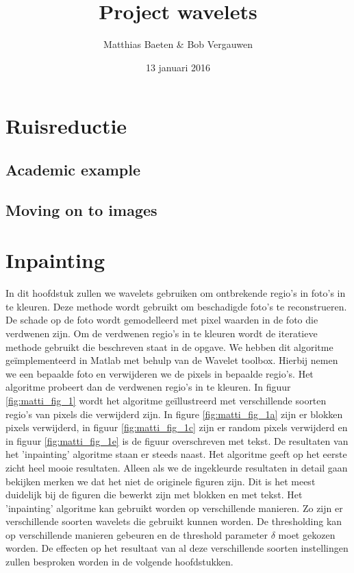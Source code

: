 

\title{Project wavelets}
\author{Matthias Baeten \& Bob Vergauwen}
\date{ 13 januari 2016}



\maketitle

\section{Ruisreductie}

\subsection{Academic example}

\subsection{Moving on to images}



\section{Inpainting}

In dit hoofdstuk zullen we wavelets gebruiken om ontbrekende regio's in foto's in te kleuren. Deze methode wordt gebruikt om beschadigde foto's te reconstrueren. De schade op de foto wordt gemodelleerd met pixel waarden in de foto die verdwenen zijn. Om de verdwenen regio's in te kleuren wordt de iteratieve methode gebruikt die beschreven staat in de opgave. We hebben dit algoritme ge\"{i}mplementeerd in Matlab met behulp van de Wavelet toolbox. Hierbij nemen we een bepaalde foto en verwijderen we de pixels in bepaalde regio's. Het algoritme probeert dan de verdwenen regio's in te kleuren. 
\newline
\newline
In figuur \ref{fig:matti_fig_1} wordt het algoritme ge\"{i}llustreerd met verschillende soorten regio's van pixels die verwijderd zijn. In figure \ref{fig:matti_fig_1a} zijn er blokken pixels verwijderd, in figuur \ref{fig:matti_fig_1c} zijn er random pixels verwijderd en in figuur \ref{fig:matti_fig_1e} is de figuur overschreven met tekst. De resultaten van het 'inpainting' algoritme staan er steeds naast. Het algoritme geeft op het eerste zicht heel mooie resultaten. Alleen als we de ingekleurde resultaten in detail gaan bekijken merken we dat het niet de originele figuren zijn. Dit is het meest duidelijk bij de figuren die bewerkt zijn met blokken en met tekst.
\newline
\newline
Het 'inpainting' algoritme kan gebruikt worden op verschillende manieren. Zo zijn er verschillende soorten wavelets die gebruikt kunnen worden. De thresholding kan op verschillende manieren gebeuren en de threshold parameter $\delta$ moet gekozen worden. De effecten op het resultaat van al deze verschillende soorten instellingen zullen besproken worden in de volgende hoofdstukken.

